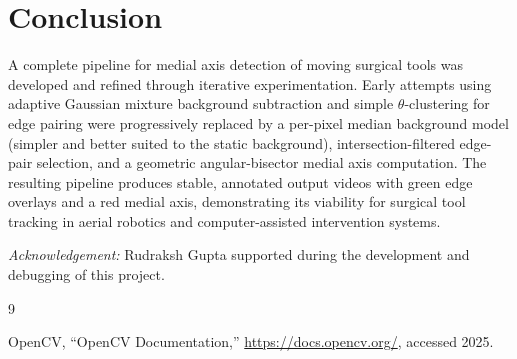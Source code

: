 \documentclass[conference, twocolumn]{IEEEtran}
\begin{document}
\section*{Conclusion}

A complete pipeline for medial axis detection of moving surgical tools was developed and refined through iterative experimentation. Early attempts using adaptive Gaussian mixture background subtraction and simple $\theta$-clustering for edge pairing were progressively replaced by a per-pixel median background model (simpler and better suited to the static background), intersection-filtered edge-pair selection, and a geometric angular-bisector medial axis computation. The resulting pipeline produces stable, annotated output videos with green edge overlays and a red medial axis, demonstrating its viability for surgical tool tracking in aerial robotics and computer-assisted intervention systems.

\textit{Acknowledgement:} Rudraksh Gupta supported during the development and debugging of this project.

\begin{thebibliography}{9}

OpenCV, ``OpenCV Documentation,'' \url{https://docs.opencv.org/}, accessed 2025.

\end{thebibliography}
\end{document}
